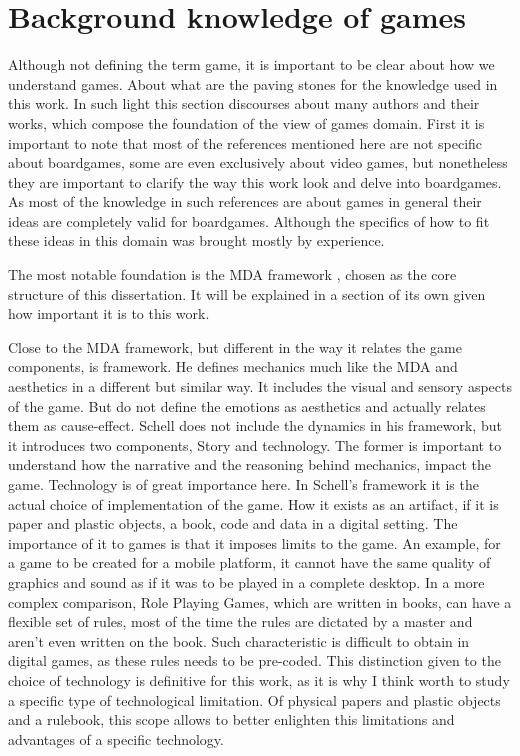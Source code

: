 \section{Background knowledge of games}

Although not defining the term game, it is important to be clear about how we understand games. About what are the paving stones for the knowledge used in this work. In such light this section discourses about many authors and their works, which compose the foundation of the view of games domain. First it is important to note that most of the references mentioned here are not specific about boardgames, some are even exclusively about video games, but nonetheless they are important to clarify the way this work look and delve into boardgames. As most of the knowledge in such references are about games in general their ideas are completely valid for boardgames. Although the specifics of how to fit these ideas in this domain was brought mostly by experience.

The most notable foundation is the MDA framework \cite{Hunicke2004}, chosen as the core structure of this dissertation. It will be explained in a section of its own given how important it is to this work.

Close to the MDA framework, but different in the way it relates the game components, is \cite{schell2014art} framework. He defines mechanics much like the MDA and aesthetics in a different but similar way. It includes the visual and sensory aspects of the game. But do not define the emotions as aesthetics and actually relates them as cause-effect. Schell does not include the dynamics in his framework, but it introduces two components, Story and technology. The former is important to understand how the narrative and the reasoning behind mechanics, impact the game. Technology is of great importance here. In Schell's framework it is the actual choice of implementation of the game. How it exists as an artifact, if it is paper and plastic objects, a book, code and data in a digital setting. The importance of it to games is that it imposes limits to the game. An example, for a game to be created for a mobile platform, it cannot have the same quality of graphics and sound as if it was to be played in a complete desktop. In a more complex comparison, Role Playing Games, which are written in books, can have a flexible set of rules, most of the time the rules are dictated by a master and aren't even written on the book. Such characteristic is difficult to obtain in digital games, as these rules needs to be pre-coded. This distinction given to the choice of technology is definitive for this work, as it is why I think worth to study a specific type of technological limitation. Of physical papers and plastic objects and a rulebook, this scope allows to better enlighten this limitations and advantages of a specific technology.

